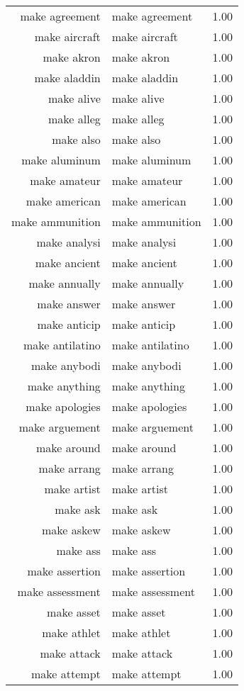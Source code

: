 \begin{table}[ht]
\begin{tabular}{rlr}
  make agreement & make agreement & 1.00 \\ 
  make aircraft & make aircraft & 1.00 \\ 
  make akron & make akron & 1.00 \\ 
  make aladdin & make aladdin & 1.00 \\ 
  make alive & make alive & 1.00 \\ 
  make alleg & make alleg & 1.00 \\ 
  make also & make also & 1.00 \\ 
  make aluminum & make aluminum & 1.00 \\ 
  make amateur & make amateur & 1.00 \\ 
  make american & make american & 1.00 \\ 
  make ammunition & make ammunition & 1.00 \\ 
  make analysi & make analysi & 1.00 \\ 
  make ancient & make ancient & 1.00 \\ 
  make annually & make annually & 1.00 \\ 
  make answer & make answer & 1.00 \\ 
  make anticip & make anticip & 1.00 \\ 
  make antilatino & make antilatino & 1.00 \\ 
  make anybodi & make anybodi & 1.00 \\ 
  make anything & make anything & 1.00 \\ 
  make apologies & make apologies & 1.00 \\ 
  make arguement & make arguement & 1.00 \\ 
  make around & make around & 1.00 \\ 
  make arrang & make arrang & 1.00 \\ 
  make artist & make artist & 1.00 \\ 
  make ask & make ask & 1.00 \\ 
  make askew & make askew & 1.00 \\ 
  make ass & make ass & 1.00 \\ 
  make assertion & make assertion & 1.00 \\ 
  make assessment & make assessment & 1.00 \\ 
  make asset & make asset & 1.00 \\ 
  make athlet & make athlet & 1.00 \\ 
  make attack & make attack & 1.00 \\ 
  make attempt & make attempt & 1.00 \\ 

\end{tabular}
\end{table}
